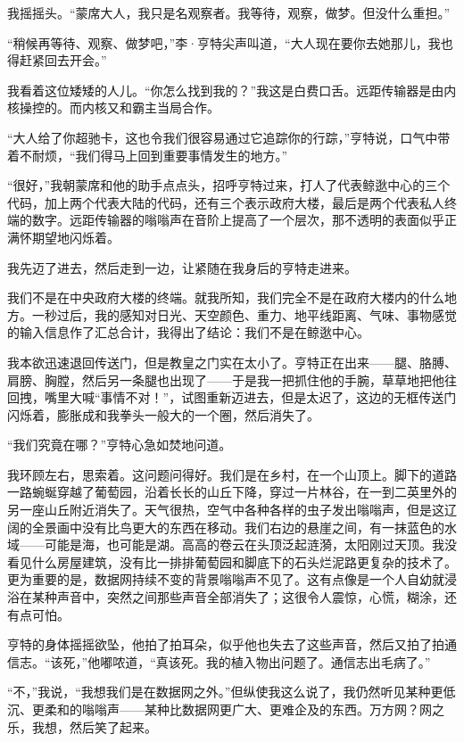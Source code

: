 \documentclass[AutoFakeBold=true]{book}
\begin{document}
我摇摇头。``蒙席大人，我只是名观察者。我等待，观察，做梦。但没什么重担。''

``稍候再等待、观察、做梦吧，''李·亨特尖声叫道，``大人现在要你去她那儿，我也得赶紧回去开会。''

我看着这位矮矮的人儿。``你怎么找到我的？''我这是白费口舌。远距传输器是由内核操控的。而内核又和霸主当局合作。

``大人给了你超驰卡，这也令我们很容易通过它追踪你的行踪，''亨特说，口气中带着不耐烦，``我们得马上回到重要事情发生的地方。''

``很好，''我朝蒙席和他的助手点点头，招呼亨特过来，打人了代表鲸逖中心的三个代码，加上两个代表大陆的代码，还有三个表示政府大楼，最后是两个代表私人终端的数字。远距传输器的嗡嗡声在音阶上提高了一个层次，那不透明的表面似乎正满怀期望地闪烁着。

我先迈了进去，然后走到一边，让紧随在我身后的亨特走进来。

\vspace*{1em}

我们不是在中央政府大楼的终端。就我所知，我们完全不是在政府大楼内的什么地方。一秒过后，我的感知对日光、天空颜色、重力、地平线距离、气味、事物感觉的输入信息作了汇总合计，我得出了结论：我们不是在鲸逖中心。

我本欲迅速退回传送门，但是教皇之门实在太小了。亨特正在出来——腿、胳膊、肩膀、胸膛，然后另一条腿也出现了——于是我一把抓住他的手腕，草草地把他往回拽，嘴里大喊``事情不对！''，试图重新迈进去，但是太迟了，这边的无框传送门闪烁着，膨胀成和我拳头一般大的一个圈，然后消失了。

``我们究竟在哪？''亨特心急如焚地问道。

我环顾左右，思索着。这问题问得好。我们是在乡村，在一个山顶上。脚下的道路一路蜿蜒穿越了葡萄园，沿着长长的山丘下降，穿过一片林谷，在一到二英里外的另一座山丘附近消失了。天气很热，空气中各种各样的虫子发出嗡嗡声，但是这辽阔的全景画中没有比鸟更大的东西在移动。我们右边的悬崖之间，有一抹蓝色的水域——可能是海，也可能是湖。高高的卷云在头顶泛起涟漪，太阳刚过天顶。我没看见什么房屋建筑，没有比一排排葡萄园和脚底下的石头烂泥路更复杂的技术了。更为重要的是，数据网持续不变的背景嗡嗡声不见了。这有点像是一个人自幼就浸浴在某种声音中，突然之间那些声音全部消失了；这很令人震惊，心慌，糊涂，还有点可怕。

亨特的身体摇摇欲坠，他拍了拍耳朵，似乎他也失去了这些声音，然后又拍了拍通信志。``该死，''他嘟哝道，``真该死。我的植入物出问题了。通信志出毛病了。''

``不，''我说，``我想我们是在数据网之外。''但纵使我这么说了，我仍然听见某种更低沉、更柔和的嗡嗡声——某种比数据网更广大、更难企及的东西。万方网？网之乐，我想，然后笑了起来。
\end{document}

